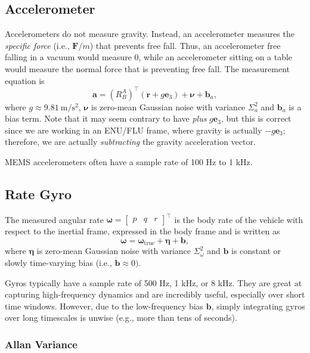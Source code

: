 \documentclass[a4paper]{article}
\begin{document}
\subsection*{Accelerometer}
Accelerometers do not measure gravity.
Instead, an accelerometer measures the \textit{specific force} (i.e., $\bm{F}/m$) that prevents free fall.
Thus, an accelerometer free falling in a vacuum would measure $0$, while an accelerometer sitting on a table would measure the normal force that is preventing free fall.
The measurement equation is
\begin{equation}
  \bm{a} = \left(R^A_B\right)^\top (\ddot{\bm r} + g\bm{e}_3) + \bm{\nu} + \bm{b}_a,
\end{equation}
where $g\approx\SI{9.81}{\meter\per\second^2}$, $\bm{\nu}$ is zero-mean Gaussian noise with variance $\Sigma^2_a$ and $\bm{b}_a$ is a bias term.
Note that it may seem contrary to have \textit{plus} $g\bm{e}_3$, but this is correct since we are working in an ENU/FLU frame, where gravity is actually $-g\bm{e}_3$; therefore, we are actually \textit{subtracting} the gravity acceleration vector.

MEMS accelerometers often have a sample rate of 100 Hz to 1 kHz.

\subsection*{Rate Gyro}
The measured angular rate $\bm{\omega} = \begin{bmatrix}p&q&r\end{bmatrix}^\top$ is the body rate of the vehicle with respect to the inertial frame, expressed in the body frame and is written as
\begin{equation}
  \bm{\omega} = \bm{\omega}_\text{true} + \bm{\eta} + \bm{b},
\end{equation}
where $\bm{\eta}$ is zero-mean Gaussian noise with variance $\Sigma^2_\omega$ and $\bm{b}$ is constant or slowly time-varying bias (i.e., $\dot{\bm b}\approx 0)$.

Gyros typically have a sample rate of 500 Hz, 1 kHz, or 8 kHz.
They are great at capturing high-frequency dynamics and are incredibly useful, especially over short time windows.
However, due to the low-frequency bias $\bm{b}$, simply integrating gyros over long timescales is unwise (e.g., more than tens of seconds).

\subsubsection*{Allan Variance}
\end{document}
